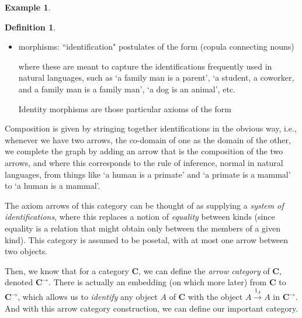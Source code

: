 \documentclass[a4paper]{book}
\theoremstyle{definition}
\newtheorem{example}{Example}[section]
\theoremstyle{definition}
\newtheorem{definition}{Definition}[section]
\theoremstyle{definition}
\theoremstyle{theorem}
\theoremstyle{definition}
\begin{document}
\begin{example}
\begin{definition}
\begin{itemize}
			\begin{center} 
			\end{center}
			\item morphisms: ``identification" postulates of the form (copula connecting nouns)
			\begin{center} 
			\end{center} 
			where these are meant to capture the identifications frequently used in natural languages, such as `a family man is a parent', `a student, a coworker, and a family man is a family man', `a dog is an animal', etc. \par 
			Identity morphisms are those particular axioms of the form 
			\begin{center} 
			\end{center} 
		\end{itemize}
		Composition is given by stringing together identifications in the obvious way, i.e., whenever we have two arrows, the co-domain of one as the domain of the other, we complete the graph by adding an arrow that is the composition of the two arrows, and where this corresponds to the rule of inference, normal in natural languages, from things like `a human is a primate' and `a primate is a mammal' to `a human is a mammal'.   
	\end{definition} 
	The axiom arrows of this category can be thought of as supplying a \textit{system of identifications}, where this replaces a notion of \textit{equality} between kinds (since equality is a relation that might obtain only between the members of a given kind). This category is assumed to be posetal, with at most one arrow between two objects.\par 
Then, we know that for a category \textbf{C}, we can define the \textit{arrow category} of \textbf{C}, denoted $\textbf{C}^{\rightarrow}$. There is actually an embedding (on which more later) from $\textbf{C}$ to $\textbf{C}^{\rightarrow}$, which allows us to \textit{identify} any object $A$ of $\textbf{C}$ with the object $A \xrightarrow{1_A} A$ in $\textbf{C}^{\rightarrow}$. And with this arrow category construction, we can define our important category. 

\end{example}
\end{document}
